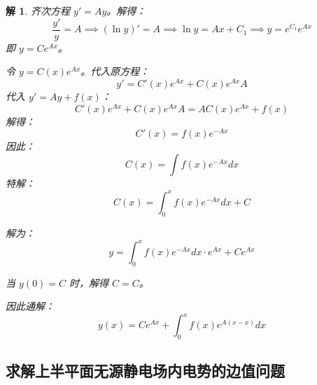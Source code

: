 \documentclass[12pt,a4paper]{article}
\numberwithin{subsection}{section}   %
\numberwithin{subsubsection}{subsection}
\theoremstyle{plain}
\newtheorem{solution}{解}[section]  %
\theoremstyle{definition}
\theoremstyle{remark}
\theoremstyle{remark}
\begin{document}
\begin{solution}
齐次方程 $y' = A y$。解得：
\begin{equation}
	\frac{y'}{y} = A \implies (\ln y)' = A \implies \ln y = A x + C_1 \implies y = e^{C_1} e^{A x}
\end{equation}
即 $y = C e^{A x}$。

 令 $y = C(x) e^{A x}$。代入原方程：
\begin{equation}
	y' = C'(x) e^{A x} + C(x) e^{A x} A
\end{equation}
代入 $y' = A y + f(x)$：
\begin{equation}
	C'(x) e^{A x} + C(x) e^{A x} A = A C(x) e^{A x} + f(x)
\end{equation}
解得：
\begin{equation}
	C'(x) = f(x) e^{-A x}
\end{equation}
因此：
\begin{equation}
	C(x) = \int f(x) e^{-A x} dx
\end{equation}
特解：
\begin{equation}
	C(x) = \int_0^x f(x) e^{-A x} dx + C
\end{equation}

解为：
\begin{equation}
	y = \int_0^x f(x) e^{-A x} dx \cdot e^{A x} + C e^{A x}
\end{equation}

当 $y(0) = C$ 时，解得 $C = C$。

因此通解：
\begin{equation}
	y(x) = C e^{A x} + \int_0^x f(x) e^{A (x - x)} dx
\end{equation}


\subsection{求解上半平面无源静电场内电势的边值问题}
\end{solution}
\end{document}
